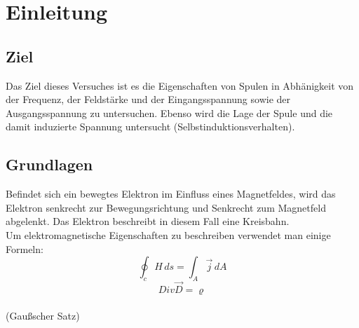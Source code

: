 \chapter{Einleitung}
\section{Ziel}
Das Ziel dieses Versuches ist es die Eigenschaften von Spulen in Abhänigkeit von der Frequenz, der Feldstärke und der Eingangsspannung sowie der  Ausgangsspannung zu untersuchen. Ebenso wird die Lage der Spule und die damit induzierte Spannung untersucht (Selbstinduktionsverhalten).
\section{Grundlagen}
Befindet sich ein bewegtes Elektron im Einfluss eines Magnetfeldes, wird das Elektron senkrecht zur Bewegungsrichtung und Senkrecht zum Magnetfeld abgelenkt. Das Elektron beschreibt in diesem Fall eine Kreisbahn.\\
Um elektromagnetische Eigenschaften zu beschreiben verwendet man einige Formeln:\\
\begin{equation}
\oint_c H \,ds= \int_A \vec j \,dA
\end{equation}
\begin{equation}
Div \vec D = \varrho 
\end{equation}
\\(Gaußscher Satz)

